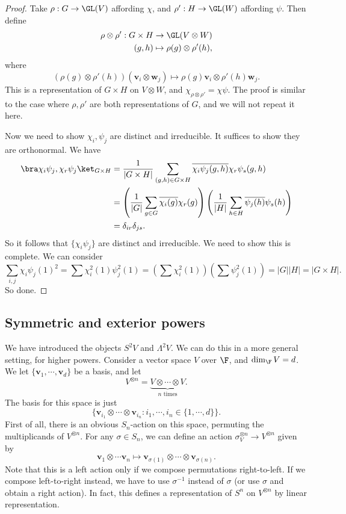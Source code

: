 \documentclass[a4paper]{article}
\begin{document}
\begin{proof}
  Take $\rho: G \to \GL(V)$ affording $\chi$, and $\rho': H \to \GL(W)$ affording $\psi$. Then define
  \begin{align*}
    \rho \otimes \rho': G \times H &\to \GL(V\otimes W)\\
    (g, h) &\mapsto \rho(g) \otimes \rho'(h),
  \end{align*}
  where
  \[
    (\rho(g)\otimes \rho'(h))(\mathbf{v}_i \otimes \mathbf{w}_j) \mapsto \rho(g) \mathbf{v}_i \otimes \rho'(h) \mathbf{w}_j.
  \]
  This is a representation of $G \times H$ on $V\otimes W$, and $\chi_{\rho\otimes \rho'} = \chi \psi$. The proof is similar to the case where $\rho, \rho'$ are both representations of $G$, and we will not repeat it here.

  Now we need to show $\chi_i, \psi_j$ are distinct and irreducible. It suffices to show they are orthonormal. We have
  \begin{align*}
    \bra \chi_i \psi_j, \chi_r \psi_j\ket_{G\times H} &= \frac{1}{|G\times H|} \sum_{(g, h) \in G\times H} \overline{\chi_i \psi_j (g, h)}\chi_r \psi_s(g, h)\\
    &= \left(\frac{1}{|G|} \sum_{g \in G} \overline{\chi_i (g)}\chi_r(g)\right)\left(\frac{1}{|H|}\sum_{h \in H} \overline{\psi_j(h)} \psi_s(h)\right)\\
    &= \delta_{ir} \delta_{js}.
  \end{align*}
  So it follows that $\{\chi_i \psi_j\}$ are distinct and irreducible. We need to show this is complete. We can consider
  \[
    \sum_{i, j} \chi_i \psi_j (1)^2 = \sum \chi_i^2 (1) \psi_j^2(1) = \left(\sum \chi_i^2(1)\right)\left(\sum \psi_j^2(1)\right) = |G||H| = |G\times H|.
  \]
  So done.
\end{proof}
\subsection{Symmetric and exterior powers}
We have introduced the objects $S^2 V$ and $\Lambda^2 V$. We can do this in a more general setting, for higher powers. Consider a vector space $V$ over $\F$, and $\dim_\F V = d$. We let $\{\mathbf{v}_1, \cdots, \mathbf{v}_d\}$ be a basis, and let
\[
  V^{\otimes n} = \underbrace{V\otimes \cdots \otimes V}_{n\text{ times}}.
\]
The basis for this space is just
\[
  \{\mathbf{v}_{i_1} \otimes \cdots \otimes \mathbf{v}_{i_n}: i_1, \cdots, i_n \in \{1, \cdots, d\}\}.
\]
First of all, there is an obvious $S_n$-action on this space, permuting the multiplicands of $V^{\otimes n}$. For any $\sigma \in S_n$, we can define an action $\sigma_ V^{\otimes n} \to V^{\otimes n}$ given by
\[
  \mathbf{v}_1 \otimes \cdots \mathbf{v}_n \mapsto \mathbf{v}_{\sigma(1)} \otimes \cdots \otimes \mathbf{v}_{\sigma(n)}.
\]
Note that this is a left action only if we compose permutations right-to-left. If we compose left-to-right instead, we have to use $\sigma^{-1}$ instead of $\sigma$ (or use $\sigma$ and obtain a right action). In fact, this defines a representation of $S^n$ on $V^{\otimes n}$ by linear representation.
\end{document}
